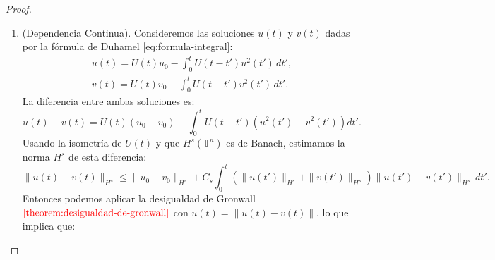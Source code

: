 \begin{proof}
\begin{enumerate}
                        $$\sup_{t \in [-T, T]} \|u(t)\|_{H^s} + \sup_{t \in [-T, T]} \|v(t)\|_{H^s} \leq M$$
                        Siguiendo un argumento similar a la cota que hayamos en la parte de existencia, se llega a que existe $c > 0$ tal que si $t \in [-T_1, T_1]$ con $0<T_1\leq T$ se sigue que 
                        $$\|u(t) - v(t)\|_{H^s} \leq c M T_1\sup_{t \in [-T_1, T_1]} \|u(t) - v(t)\|_{H^s}.$$
                        Si escogemos $T_1 = \min\{T, \frac{1}{2cM}\}$, la desigualdad anterior nos implica que:
                        $$\sup_{t \in [-T_1, T_1]}\|u(t) - v(t)\|_{H^s} \leq \frac{1}{2} \sup_{t \in [-T_1, T_1]} \|u(t) - v(t)\|_{H^s},$$
                        lo cual solamente es cierto si $u(t) = v(t)$ para todo $t \in [-T_1, T_1]$. Ahora, si $T_1 \neq T$ razonamos de forma análoga al proceso anterior, y tomando $t\in [-2T_1,T_1]\cup[T_1,2T_1]$ para llegar a la siguiente forma:
                        $$\|u(t) - v(t)\|_{H^s} \leq C M 2 T_1 \sup_{t \in [-2T_1, -T_1]\cup [T_1, 2T_1]} \|u(t) - v(t)\|.$$
                        Y de forma análoga al caso $T_1$, se concluye que $u(t) = v(t)$ para todo $t \in [-2T_1, 2T_1]$.\\
                        Ahora, si $T \leq 2T_1$, se concluye la demostración.\\
                        De lo contrario, se puede iterar el argumento con $4T_1, 8T_1, \cdots$ hasta que $kT_1 \geq T$, concluyendo que $u(t) = v(t)$ en todo el intervalo $[-T,T]$.
            \item (Dependencia Continua).
                Consideremos las soluciones \( u(t) \) y \( v(t) \) dadas por la fórmula de Duhamel \textcolor{red}{\ref{eq:formula-integral}}:
                \begin{align*}
                    u(t) = U(t) u_0 - \int_0^t U(t - t') u^2(t') \, dt',\\
                    v(t) = U(t) v_0 - \int_0^t U(t - t') v^2(t') \, dt'.
                \end{align*}
                La diferencia entre ambas soluciones es:
                $$u(t) - v(t) = U(t)(u_0 - v_0) - \int_0^t U(t - t') \left( u^2(t') - v^2(t') \right) dt'.$$
                Usando la isometría de $U(t)$ y que $H^s(\mathbb{T}^n)$ es de Banach, estimamos la norma $H^s$ de esta diferencia:
                $$\|u(t) - v(t)\|_{H^s} \leq \|u_0 - v_0\|_{H^s} + C_s \int_0^t \left( \|u(t')\|_{H^s} + \|v(t')\|_{H^s} \right) \|u(t') - v(t')\|_{H^s} \, dt'.$$
                Entonces podemos aplicar la desigualdad de Gronwall $\textcolor{red}{\ref{theorem:desigualdad-de-gronwall}}$ con $u(t) = \|u(t) - v(t)\|$, lo que implica que:

\end{enumerate}
\end{proof}
